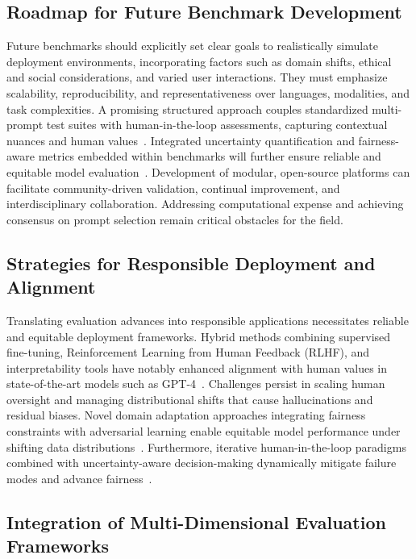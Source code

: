 \documentclass[sigconf]{acmart}
\begin{document}
\subsection{Roadmap for Future Benchmark Development}

Future benchmarks should explicitly set clear goals to realistically simulate deployment environments, incorporating factors such as domain shifts, ethical and social considerations, and varied user interactions. They must emphasize scalability, reproducibility, and representativeness over languages, modalities, and task complexities. A promising structured approach couples standardized multi-prompt test suites with human-in-the-loop assessments, capturing contextual nuances and human values~\cite{ref11,ref20,ref21}. Integrated uncertainty quantification and fairness-aware metrics embedded within benchmarks will further ensure reliable and equitable model evaluation~\cite{ref35,ref41}. Development of modular, open-source platforms can facilitate community-driven validation, continual improvement, and interdisciplinary collaboration. Addressing computational expense and achieving consensus on prompt selection remain critical obstacles for the field.

\subsection{Strategies for Responsible Deployment and Alignment}

Translating evaluation advances into responsible applications necessitates reliable and equitable deployment frameworks. Hybrid methods combining supervised fine-tuning, Reinforcement Learning from Human Feedback (RLHF), and interpretability tools have notably enhanced alignment with human values in state-of-the-art models such as GPT-4~\cite{ref20,ref11}. Challenges persist in scaling human oversight and managing distributional shifts that cause hallucinations and residual biases. Novel domain adaptation approaches integrating fairness constraints with adversarial learning enable equitable model performance under shifting data distributions~\cite{ref41}. Furthermore, iterative human-in-the-loop paradigms combined with uncertainty-aware decision-making dynamically mitigate failure modes and advance fairness~\cite{ref31,ref35}.

\subsection{Integration of Multi-Dimensional Evaluation Frameworks}
\end{document}
